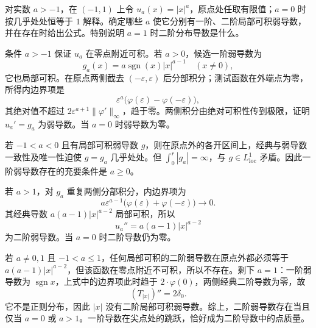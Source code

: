 \begin{exercise}\label{b1:ex:20-power-weak-derivative-thresholds}
对实数 \(a>-1\)，在 \((-1,1)\) 上令 \(u_a(x)=|x|^a\)，原点处任取有限值；\(a=0\) 时按几乎处处恒等于 \(1\) 解释。确定哪些 \(a\) 使它分别有一阶、二阶局部可积弱导数，并在存在时给出公式。特别说明 \(a=1\) 时二阶分布导数是什么。
\end{exercise}
\begin{solution}
条件 \(a>-1\) 保证 \(u_a\) 在零点附近可积。若 \(a>0\)，候选一阶弱导数为
\[
 g_a(x)=a\operatorname{sgn}(x)|x|^{a-1}\quad(x\ne0),
\]
它也局部可积。在原点两侧截去 \((-\varepsilon,\varepsilon)\) 后分部积分；测试函数在外端点为零，所得内边界项是
\[
 \varepsilon^a\bigl(\varphi(\varepsilon)-\varphi(-\varepsilon)\bigr),
\]
其绝对值不超过 \(2\varepsilon^{a+1}\|\varphi'\|_\infty\)，趋于零。两侧积分由绝对可积性传到极限，证明 \(u_a'=g_a\) 为弱导数。当 \(a=0\) 时弱导数为零。

若 \(-1<a<0\) 且有局部可积弱导数 \(g\)，则在原点外的各开区间上，经典与弱导数一致性及唯一性迫使 \(g=g_a\) 几乎处处。但 \(\int_0^r|g_a|=\infty\)，与 \(g\in L^1_{\mathrm{loc}}\) 矛盾。因此一阶弱导数存在的充要条件是 \(a\ge0\)。

若 \(a>1\)，对 \(g_a\) 重复两侧分部积分，内边界项为
\[
 a\varepsilon^{a-1}\bigl(\varphi(\varepsilon)+\varphi(-\varepsilon)\bigr)\longrightarrow0.
\]
其经典导数 \(a(a-1)|x|^{a-2}\) 局部可积，所以
\[
 u_a''=a(a-1)|x|^{a-2}
\]
为二阶弱导数。当 \(a=0\) 时二阶导数仍为零。

若 \(a\ne0,1\) 且 \(-1<a\le1\)，任何局部可积的二阶弱导数在原点外都必须等于 \(a(a-1)|x|^{a-2}\)，但该函数在零点附近不可积，所以不存在。剩下 \(a=1\)：一阶弱导数为 \(\operatorname{sgn}x\)，上式中的边界项此时趋于 \(2\cdot \varphi(0)\)，两侧经典二阶导数为零，故
\[
 (T_{|x|})''=2\delta_0.
\]
它不是正则分布，因此 \(|x|\) 没有二阶局部可积弱导数。综上，二阶弱导数存在当且仅当 \(a=0\) 或 \(a>1\)。一阶导数在尖点处的跳跃，恰好成为二阶导数中的点质量。
\end{solution}
